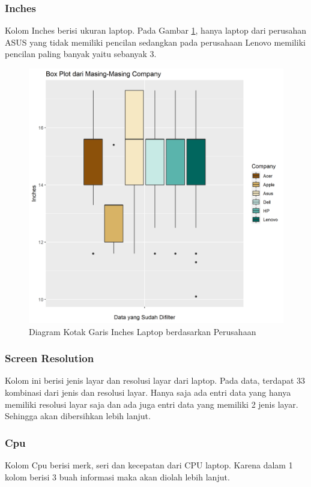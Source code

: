 \documentclass[12pt]{article}
\begin{document}
\subsubsection{Inches}
Kolom Inches berisi ukuran laptop. Pada Gambar \ref{fig:ahayn}, hanya laptop dari perusahan ASUS yang tidak memiliki pencilan sedangkan pada perusahaan Lenovo memiliki pencilan paling banyak yaitu sebanyak 3. 
\begin{figure}[h!]
    \centering
    \includegraphics[scale = 0.4]{boxplot2.png}
    \caption{Diagram Kotak Garis Inches Laptop berdasarkan Perusahaan}
    \label{fig:ahayn}
\end{figure}
\subsubsection{Screen Resolution}
Kolom ini berisi jenis layar dan resolusi layar dari laptop. Pada data, terdapat 33 kombinasi dari jenis dan resolusi layar. Hanya saja ada entri data yang hanya memiliki resolusi layar saja dan ada juga entri data yang memiliki 2 jenis layar.
Sehingga akan dibersihkan lebih lanjut.
\subsubsection{Cpu}
Kolom Cpu berisi merk, seri dan kecepatan dari CPU laptop. Karena dalam 1 kolom berisi 3 buah informasi maka akan diolah lebih lanjut. 
\end{document}

